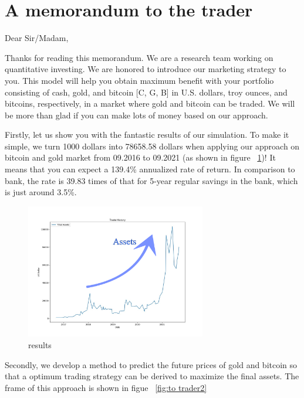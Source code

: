 \documentclass{mcmthesis}
\begin{document}
\section{A memorandum to the trader}
\memodate{\today}
\begin{memo}[Memorandum]

Dear Sir/Madam,

Thanks for reading this memorandum. We are a research team working on quantitative investing. We are honored to introduce our marketing strategy to you. This model will help you obtain maximum benefit with your portfolio consisting of cash, gold, and bitcoin [C, G, B] in U.S. dollars, troy ounces, and bitcoins, respectively, in a market where gold and bitcoin can be traded. We will be more than glad if you can make lots of money based on our approach. 


Firstly, let us show you with the fantastic results of our simulation. To make it simple, we turn 1000 dollars into 78658.58 dollars when applying our approach on bitcoin and gold market from 09.2016 to 09.2021 (as shown in figure ~\ref{fig:to trader1})! It means that you can expect a 139.4\% annualized rate of return. In comparison to bank, the rate is 39.83 times of that for 5-year regular savings in the bank, which is just around 3.5\%.


\begin{figure}[htb]
\centering
\includegraphics[width = 0.7\textwidth]{fig/trading history.png}
\caption{results}
\label{fig:to trader1}
\end{figure}

Secondly, we develop a method to predict the future prices of gold and bitcoin so that a optimum trading strategy can be derived to maximize the final assets. The frame of this approach is shown in figue ~\ref{fig:to trader2}


\end{memo}
\end{document}
